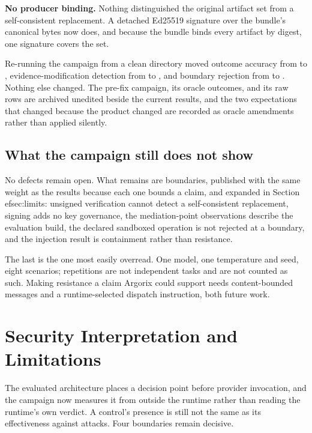 \documentclass[conference]{IEEEtran}
\begin{document}
\textbf{No producer binding.}  Nothing distinguished the original artifact set
from a self-consistent replacement.  A detached Ed25519 signature over the
bundle's canonical bytes now does, and because the bundle binds every artifact
by digest, one signature covers the set.

Re-running the campaign from a clean directory moved outcome accuracy from
\baselineAccuracy{} to \campaignAccuracy{}, evidence-modification detection
from \baselineTamper{} to \campaignTamper{}, and boundary rejection from
\baselineBoundaryRejection{} to \campaignBoundaryRejection{}.  Nothing else
changed.  The pre-fix campaign, its oracle outcomes, and its raw rows are
archived unedited beside the current results, and the two expectations that
changed because the product changed are recorded as oracle amendments rather
than applied silently.

\subsection{What the campaign still does not show}

No defects remain open.  What remains are \campaignBoundaries{} boundaries,
published with the same weight as the results because each one bounds a claim,
and expanded in Section~
ef{sec:limits}: unsigned verification cannot detect a
self-consistent replacement, signing adds no key governance, the mediation-point
observations describe the evaluation build, the declared sandboxed operation is
not rejected at a boundary, and the injection result is containment rather than
resistance.

The last is the one most easily overread.  One model, one temperature and seed,
eight scenarios; repetitions are not independent tasks and are not counted as
such.  Making resistance a claim Argorix could support needs content-bounded
messages and a runtime-selected dispatch instruction, both future work.

\section{Security Interpretation and Limitations}
\label{sec:limits}

The evaluated architecture places a decision point before provider invocation,
and the campaign now measures it from outside the runtime rather than reading
the runtime's own verdict.  A control's presence is still not the same as its
effectiveness against attacks.  Four boundaries remain decisive.
\end{document}
